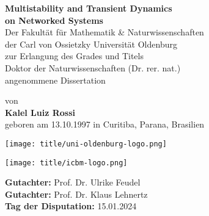 \begin{titlepage}
    \centering
    
    {\Large \textbf{Multistability and Transient Dynamics \\[0.25cm] on Networked Systems}} \\[2.2cm]  %
    
    \vspace*{2.2cm}  %
    {\large Der Fakultät für Mathematik \& Naturwissenschaften \\[0.25cm]
    der Carl von Ossietzky Universität Oldenburg \\[0.25cm]
    zur Erlangung des Grades und Titels \\[0.25cm]
    Doktor der Naturwissenschaften (Dr. rer. nat.) \\[0.25cm]
    angenommene Dissertation}
    
    \vspace*{6.35cm}
    {\large von \\[0.28cm]
    \textbf{Kalel Luiz Rossi} \\[0.28cm]
    geboren am 13.10.1997 in Curitiba, Parana, Brasilien}
    
	\vfill
    \begin{minipage}{0.4\textwidth}
        \centering
        \texttt{[image: title/uni-oldenburg-logo.png]}  %
    \end{minipage}
    \hfill
    \begin{minipage}{0.4\textwidth}
        \centering
        \texttt{[image: title/icbm-logo.png]}  %
    \end{minipage}
    
\end{titlepage}

\newpage  %


\vspace*{\fill}  %
\begin{flushleft}
	\large
    \textbf{Gutachter:} Prof. Dr. Ulrike Feudel  \\[0.2cm]
    \textbf{Gutachter:} Prof. Dr. Klaus Lehnertz \\[0.2cm]
    \textbf{Tag der Disputation:} 15.01.2024
\end{flushleft}

\newpage  %